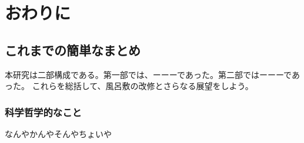 \part{おわりに}
\setcounter{chapter}{0} %
\chapter{これまでの簡単なまとめ}
本研究は二部構成である。第一部では、ーーーであった。第二部ではーーーであった。
これらを総括して、風呂敷の改修とさらなる展望をしよう。
\section{科学哲学的なこと}
なんやかんやそんやちょいや




